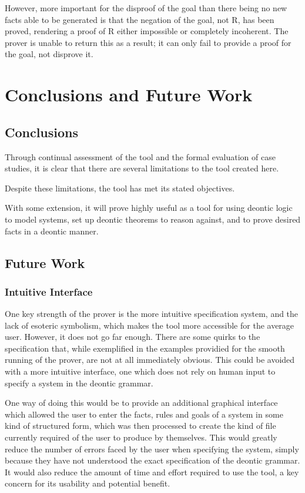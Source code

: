 \documentclass{l4proj}
\begin{document}
However, more important for the disproof of the goal than there being no new facts able to be generated is that the negation of the goal, not R, has been proved, rendering a proof of R either impossible or completely incoherent. The prover is unable to return this as a result; it can only fail to provide a proof for the goal, not disprove it. 

\chapter{Conclusions and Future Work}

\section{Conclusions}
Through continual assessment of the tool and the formal evaluation of case studies, it is clear that there are several limitations to the tool created here. 

Despite these limitations, the tool has met its stated objectives. 

With some extension, it will prove highly useful as a tool for using deontic logic to model systems, set up deontic theorems to reason against, and to prove desired facts in a deontic manner. 

\section{Future Work}

\subsection{Intuitive Interface}
One key strength of the prover is the more intuitive specification system, and the lack of esoteric symbolism, which makes the tool more accessible for the average user. However, it does not go far enough. There are some quirks to the specification that, while exemplified in the examples providied for the smooth running of the prover, are not at all immediately obvious. This could be avoided with a more intuitive interface, one which does not rely on human input to specify a system in the deontic grammar. 

One way of doing this would be to provide an additional graphical interface which allowed the user to enter the facts, rules and goals of a system in some kind of structured form, which was then processed to create the kind of file currently required of the user to produce by themselves. This would greatly reduce the number of errors faced by the user when specifying the system, simply because they have not understood the exact specification of the deontic grammar. It would also reduce the amount of time and effort required to use the tool, a key concern for its usability and potential benefit. 
\end{document}
